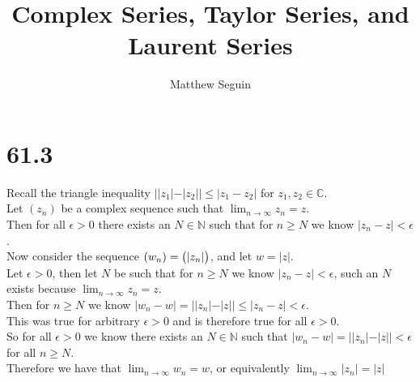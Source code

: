 \documentclass{article}
\title{Complex Series, Taylor Series, and Laurent Series}
\author{Matthew Seguin}
\date{}
\begin{document}
\maketitle

\section*{61.3}
\begin{center}
    \doublespacing
    Recall the triangle inequality $||z_1| - |z_2||\leq |z_1 - z_2|$ for $z_1, z_2\in\mathbb{C}$.
    \\Let $(z_n)$ be a complex sequence such that $\lim _{n\to\infty} z_n = z$.
    \\Then for all $\epsilon > 0$ there exists an $N\in\mathbb{N}$ such that for $n\geq N$ we know $|z_n - z| <\epsilon$.
    \\Now consider the sequence $(w_n) =\big{(}|z_n|\big{)}$, and let $w = |z|$.
    \\Let $\epsilon > 0$, then let $N$ be such that for $n\geq N$ we know $|z_n - z| <\epsilon$, such an $N$ exists because $\lim _{n\to\infty} z_n = z$.
    \\Then for $n\geq N$ we know $|w_n - w| = ||z_n| - |z||\leq |z_n - z| <\epsilon$.
    \\This was true for arbitrary $\epsilon > 0$ and is therefore true for all $\epsilon > 0$.
    \\So for all $\epsilon > 0$ we know there exists an $N\in\mathbb{N}$ such that $|w_n - w| = ||z_n| - |z|| <\epsilon$ for all $n\geq N$.
    \\Therefore we have that $\lim _{n\to\infty} w_n = w$, or equivalently $\lim _{n\to\infty} |z_n| = |z|$ \qedsymbol
\end{center}


\newpage
\end{document}

